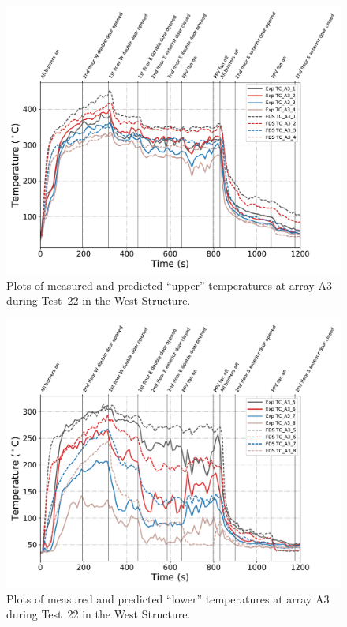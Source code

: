 \begin{figure}[!h]
	\centering
	\includegraphics[width=\columnwidth]{Figures/Plots/Validation/Temperature/Test_22_TC_A3_upper}
	\caption{Plots of measured and predicted ``upper'' temperatures at array A3 during Test~22 in the West Structure.}
	\label{fig:TCA3_upper_data_Test22}
\end{figure}

\begin{figure}[!h]
	\centering
	\includegraphics[width=\columnwidth]{Figures/Plots/Validation/Temperature/Test_22_TC_A3_lower}
	\caption{Plots of measured and predicted ``lower'' temperatures at array A3 during Test~22 in the West Structure.}
	\label{fig:TCA3_lower_data_Test22}
\end{figure}


